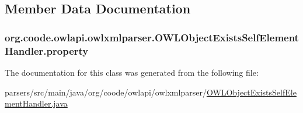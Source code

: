 \subsection{Member Data Documentation}
\hypertarget{classorg_1_1coode_1_1owlapi_1_1owlxmlparser_1_1_o_w_l_object_exists_self_element_handler_a5a9c119393f18bb50663b11be997c976}{
\subsubsection[{property}]{ org.\-coode.\-owlapi.\-owlxmlparser.\-O\-W\-L\-Object\-Exists\-Self\-Element\-Handler.\-property\hspace{0.3cm}{\ttfamily [private]}}}\label{classorg_1_1coode_1_1owlapi_1_1owlxmlparser_1_1_o_w_l_object_exists_self_element_handler_a5a9c119393f18bb50663b11be997c976}


The documentation for this class was generated from the following file\-:\begin{DoxyCompactItemize}
\item 
parsers/src/main/java/org/coode/owlapi/owlxmlparser/\hyperlink{_o_w_l_object_exists_self_element_handler_8java}{O\-W\-L\-Object\-Exists\-Self\-Element\-Handler.\-java}\end{DoxyCompactItemize}
